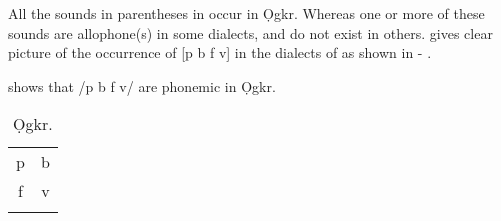 \documentclass[output=paper,
modfonts
]{langscibook}
\begin{document}
\begin{table}
\caption{The phonemic consonants of Ikwere.}
\label{tab:alerechi:2}
\end{table}

All the sounds in parentheses in  occur in Ọgkr. Whereas one or more of these sounds are allophone(s) in some dialects, and do not exist in others. \citet[99]{Alerechi2007a} gives clear picture of the occurrence of [p b f v] in the dialects of  as shown in   - .

  
 shows that /p b f v/ are phonemic in Ọgkr.
\begin{table}
\begin{tabular}{cc}
\lsptoprule
 p& b\\
 f& v\\
\lspbottomrule
\end{tabular}
\caption{Ọgkr.}
\label{tab:alerechi:3}
\end{table}
\end{document}
